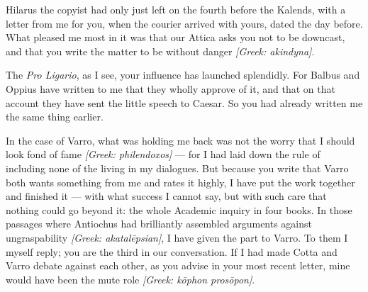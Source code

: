 

 Hilarus the copyist had only just left on the fourth before the Kalends, with a letter from me for you, when the courier arrived with yours, dated the day before. What pleased me most in it was that our Attica asks you not to be downcast, and that you write the matter to be without danger \textit{[Greek: akindyna]}.

 The \textit{Pro Ligario}, as I see, your influence has launched splendidly. For Balbus and Oppius have written to me that they wholly approve of it, and that on that account they have sent the little speech to Caesar. So you had already written me the same thing earlier.

 In the case of Varro, what was holding me back was not the worry that I should look fond of fame \textit{[Greek: philendoxos]} --- for I had laid down the rule of including none of the living in my dialogues. But because you write that Varro both wants something from me and rates it highly, I have put the work together and finished it --- with what success I cannot say, but with such care that nothing could go beyond it: the whole Academic inquiry in four books. In those passages where Antiochus had brilliantly assembled arguments against ungraspability \textit{[Greek: akatal\=epsian]}, I have given the part to Varro. To them I myself reply; you are the third in our conversation. If I had made Cotta and Varro debate against each other, as you advise in your most recent letter, mine would have been the mute role \textit{[Greek: k\=ophon pros\=opon]}.

